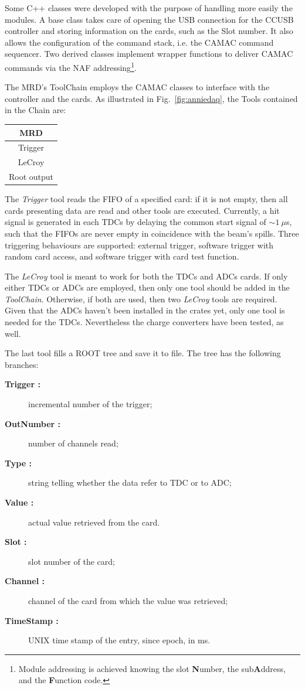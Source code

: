  Some C++ classes were developed with the purpose of handling more easily the modules.
 A base class takes care of opening the USB connection for the CCUSB controller and storing %
 information on the cards, such as the Slot number.
 It also allows the configuration of the command stack, i.e. the CAMAC command sequencer.
 Two derived classes implement wrapper functions to deliver CAMAC commands via the %
 NAF addressing\footnote{Module addressing is achieved knowing the slot \textbf{N}umber, %
 the sub\textbf{A}ddress, and the \textbf{F}unction code.}.

 The MRD's ToolChain employs the CAMAC classes to interface with the controller and the cards.
 As illustrated in Fig.~\ref{fig:anniedaq}, the Tools contained in the Chain are:

\begin{center}
  \small
  \begin{tabular}{c}
    \toprule
    \textbf{MRD}	\\
    \midrule
    Trigger	\\
    LeCroy 	\\
    Root output	\\
    \bottomrule
  \end{tabular}
\end{center}

 The \emph{Trigger} tool reads the FIFO of a specified card: if it is not empty, then all %
 cards presenting data are read and other tools are executed.
 Currently, a hit signal is generated in each TDCs by delaying the common start %
 signal of $\sim 1~\mu$s, such that the FIFOs are never empty in coincidence with the beam's spills.
 Three triggering behaviours are supported: external trigger, software trigger with %
 random card access, and software trigger with card test function.

 The \emph{LeCroy} tool is meant to work for both the TDCs and ADCs cards.
 If only either TDCs or ADCs are employed, then only one tool should be added in the \emph{ToolChain}.
 Otherwise, if both are used, then two \emph{LeCroy} tools are required.
 Given that the ADCs haven't been installed in the crates yet, only one tool is %
 needed for the TDCs.
 Nevertheless the charge converters have been tested, as well.
 
 The last tool fills a ROOT tree and save it to file.
 The tree has the following branches:
 \begin{description}
  \item[\bfseries Trigger :] incremental number of the trigger;
  \item[\bfseries OutNumber :] number of channels read;
  \item[\bfseries Type :] string telling whether the data refer to TDC or to ADC;
  \item[\bfseries Value :] actual value retrieved from the card.
  \item[\bfseries Slot :] slot number of the card;
  \item[\bfseries Channel :] channel of the card from which the value was retrieved;
  \item[\bfseries TimeStamp :] UNIX time stamp of the entry, since epoch, in ms.
\end{description}

